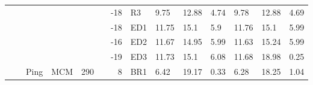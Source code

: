 {\begin{minipage}{\linewidth}
\begin{tabular}{l|l|l|l|c|c|r|l|lll|lll}
                                              &                                          &                                           &                                           &                                            &                                                                                         & -18                                                                                            & R3                                        & 9.75  & 12.88 & 4.74      & 9.78  & 12.88 & 4.69       \\
                                              &                                          &                                           &                                           &                                            &                                                                                         & -18                                                                                            & ED1                                       & 11.75 & 15.1  & 5.9       & 11.76 & 15.1  & 5.99       \\
                                              &                                          &                                           &                                           &                                            &                                                                                         & -16                                                                                            & ED2                                       & 11.67 & 14.95 & 5.99      & 11.63 & 15.24 & 5.99       \\
                                              &                                          &                                           &                                           &                                            &                                                                                         & -19                                                                                            & ED3                                       & 11.73 & 15.1  & 6.08      & 11.68 & 18.98 & 0.25       \\
  \cline{3-5}\cline{7-14}
                                              &                                          & \multirow{16}{*}{Ping}                    & \multirow{8}{*}{MCM}                      & \multicolumn{1}{l|}{\multirow{16}{*}{290}} &                                                                                         & 8                                                                                              & BR1                                       & 6.42  & 19.17 & 0.33      & 6.28  & 18.25 & 1.04       \\

\end{tabular}
\end{minipage}}

